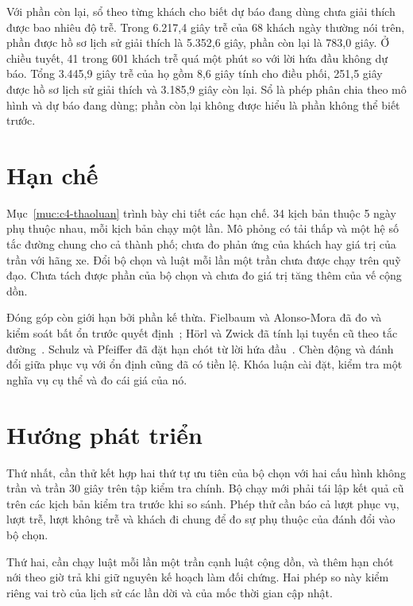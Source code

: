 Với phần còn lại, sổ theo từng khách cho biết dự báo đang dùng chưa giải thích được bao nhiêu độ trễ. Trong 6.217,4 giây trễ của 68 khách ngày thường nói trên, phần được hồ sơ lịch sử giải thích là 5.352,6 giây, phần còn lại là 783,0 giây. Ở chiều tuyết, 41 trong 601 khách trễ quá một phút so với lời hứa đầu không dự báo. Tổng 3.445,9 giây trễ của họ gồm 8,6 giây tính cho điều phối, 251,5 giây được hồ sơ lịch sử giải thích và 3.185,9 giây còn lại. Sổ là phép phân chia theo mô hình và dự báo đang dùng; phần còn lại không được hiểu là phần không thể biết trước.

\section{Hạn chế}
\label{muc:c5-hanche}

Mục~\ref{muc:c4-thaoluan} trình bày chi tiết các hạn chế. 34 kịch bản thuộc 5 ngày phụ thuộc nhau, mỗi kịch bản chạy một lần. Mô phỏng có tải thấp và một hệ số tắc đường chung cho cả thành phố; chưa đo phản ứng của khách hay giá trị của trần với hãng xe. Đổi bộ chọn và luật mỗi lần một trần chưa được chạy trên quỹ đạo. Chưa tách được phần của bộ chọn và chưa đo giá trị tăng thêm của vế cộng dồn.

Đóng góp còn giới hạn bởi phần kế thừa. Fielbaum và Alonso-Mora đã đo và kiểm soát bất ổn trước quyết định~\cite{fielbaum2020}; Hörl và Zwick đã tính lại tuyến cũ theo tắc đường~\cite{horl2022}. Schulz và Pfeiffer đã đặt hạn chót từ lời hứa đầu~\cite{schulz2026}. Chèn động và đánh đổi giữa phục vụ với ổn định cũng đã có tiền lệ. Khóa luận cài đặt, kiểm tra một nghĩa vụ cụ thể và đo cái giá của nó.

\section{Hướng phát triển}
\label{muc:c5-huongphattrien}

Thứ nhất, cần thử kết hợp hai thứ tự ưu tiên của bộ chọn với hai cấu hình không trần và trần 30 giây trên tập kiểm tra chính. Bộ chạy mới phải tái lập kết quả cũ trên các kịch bản kiểm tra trước khi so sánh. Phép thử cần báo cả lượt phục vụ, lượt trễ, lượt không trễ và khách đi chung để đo sự phụ thuộc của đánh đổi vào bộ chọn.

Thứ hai, cần chạy luật mỗi lần một trần cạnh luật cộng dồn, và thêm hạn chót nới theo giờ trả khi giữ nguyên kế hoạch làm đối chứng. Hai phép so này kiểm riêng vai trò của lịch sử các lần dời và của mốc thời gian cập nhật.

